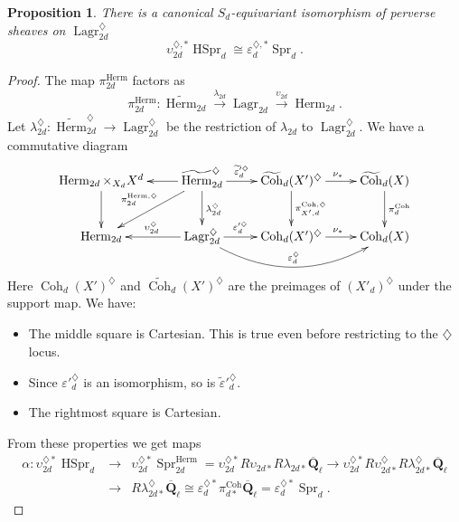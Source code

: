 \documentclass[reqno]{amsart}
\numberwithin{equation}{section}
\newcommand{\wt}[1]{\widetilde{#1}}
\newcommand{\Q}{\mathbf{Q}}
\DeclareMathOperator{\Herm}{Herm}
\DeclareMathOperator{\Lagr}{Lagr}
\DeclareMathOperator{\Coh}{Coh}
\DeclareMathOperator{\Spr}{Spr}
\DeclareMathOperator{\HSpr}{HSpr}
\newcommand{\Qlbar}{\overline{\Q}_\ell}
\newcommand\xr{\xrightarrow}
\renewcommand\a\alpha
\newcommand{\e}{\varepsilon}
\renewcommand{\l}{\lambda}
\newcommand\dm{\diamondsuit}
\newtheorem{prop}[thm]{Proposition}
\theoremstyle{remark}
\numberwithin{equation}{section}
\begin{document}
\begin{prop}\label{p:Spr HSpr}
There is a canonical $S_{d}$-equivariant isomorphism of perverse sheaves on $\Lagr^{\dm}_{2d}$
\begin{equation*}
\upsilon^{\dm,*}_{2d}\HSpr_{d}\cong \e^{\dm,*}_{d}\Spr_{d}.
\end{equation*}
\end{prop}
\begin{proof} The map $\pi^{\Herm}_{2d}$ factors as
\begin{equation*}
\pi^{\Herm}_{2d}: \wt\Herm_{2d}\xr{\l_{2d}} \Lagr_{2d}\xr{\upsilon_{2d}} \Herm_{2d}.
\end{equation*}
Let $\l^{\dm}_{2d}: \wt\Herm^{\dm}_{2d}\to \Lagr^{\dm}_{2d}$ be the restriction of $\l_{2d}$ to $\Lagr^{\dm}_{2d}$.
We have a commutative diagram
\begin{equation}\label{3sq}
\xymatrix{\Herm_{2d}\times_{X_{d}}X^{d}\ar[d] & \wt\Herm^{\dm}_{2d}\ar[l]\ar[dl]_{\pi^{\Herm,\dm}_{2d}}\ar[d]^{\l^{\dm}_{2d}}\ar[r]^-{\wt \e'^{\dm}_{d}} & \wt\Coh_{d}(X')^{\dm}\ar[d]^{\pi^{\Coh,\dm}_{X',d}}\ar[r]^{\nu_{*}} &\wt\Coh_{d}(X)\ar[d]^{\pi^{\Coh}_{d}} \\
\Herm_{2d} & \Lagr^{\dm}_{2d}\ar@/_2pc/[rr]^-{\e^{\dm}_{d}}\ar[l]_{\upsilon^{\dm}_{2d}}\ar[r]^-{\e'^{\dm}_{d}} & \Coh_{d}(X')^{\dm}\ar[r]^{\nu_{*}} &   \Coh_{d}(X)
}
\end{equation}
Here $\Coh_{d}(X')^{\dm}$ and $\wt\Coh_{d}(X')^{\dm}$ are the preimages of $(X'_{d})^{\dm}$ under the support map.  We have:
\begin{itemize}
\item The middle square is Cartesian. This is true even before restricting to the $\dm$ locus. 
\item Since $\e'^{\dm}_{d}$  is an isomorphism, so is $\wt \e'^{\dm}_{d}$.
\item The rightmost square is Cartesian. 
\end{itemize}
From these properties we get maps
\begin{eqnarray*}
\a: \upsilon^{\dm *}_{2d}\HSpr_{d} &\to& \upsilon^{\dm*}_{2d}\Spr^{\Herm}_{2d}=\upsilon^{\dm*}_{2d}R\upsilon_{2d*}R\l_{2d*}\Qlbar\to \upsilon^{\dm*}_{2d}R\upsilon^{\dm}_{2d*}R\l^{\dm}_{2d*}\Qlbar \\
&\to&  R\l^{\dm}_{2d*}\Qlbar\cong \e^{\dm*}_{d}\pi^{\Coh}_{d*}\Qlbar=\e^{\dm*}_{d}\Spr_{d}.
\end{eqnarray*}




\end{proof}
\end{document}
